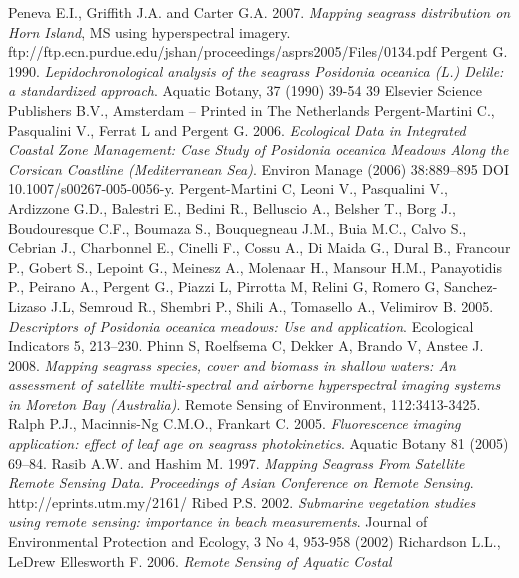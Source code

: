 \documentclass[10pt, a4paper]{article}
\begin{document}
\begin{thebibliography}{999}
Peneva E.I., Griffith J.A. and Carter G.A. 2007. \emph{Mapping seagrass distribution on Horn
Island}, MS using hyperspectral imagery.
ftp://ftp.ecn.purdue.edu/jshan/proceedings/asprs2005/Files/0134.pdf \pageref{Peneva07}
Pergent G. 1990. \emph{Lepidochronological analysis of the seagrass \textit{{Posidonia oceanica}} (L.)
Delile: a standardized approach}. Aquatic Botany, 37 (1990) 39-54 39 Elsevier Science
Publishers B.V., Amsterdam -- Printed in The Netherlands \pageref{Pergent90}
Pergent-Martini C., Pasqualini V., Ferrat L and Pergent G. 2006. \emph{Ecological Data in
Integrated Coastal Zone Management: Case Study of \textit{{Posidonia oceanica}} Meadows Along
the Corsican Coastline (Mediterranean Sea)}. Environ Manage (2006) 38:889–895 DOI
10.1007/s00267-005-0056-y. \pageref{Pergent-Martini06}
Pergent-Martini C, Leoni V., Pasqualini V., Ardizzone G.D., Balestri E., Bedini R.,
Belluscio A., Belsher T., Borg J., Boudouresque C.F., Boumaza S., Bouquegneau J.M., Buia
M.C., Calvo S., Cebrian J., Charbonnel E., Cinelli F., Cossu A., Di Maida G., Dural B.,
Francour P., Gobert S., Lepoint G., Meinesz A., Molenaar H., Mansour H.M., Panayotidis
P., Peirano A., Pergent G., Piazzi L, Pirrotta M, Relini G, Romero G, Sanchez-Lizaso J.L,
Semroud R., Shembri P., Shili A., Tomasello A., Velimirov B. 2005. \emph{Descriptors of
\textit{{Posidonia oceanica}} meadows: Use and application}. Ecological Indicators 5, 213–230. \pageref{Pergent-Martini05}
Phinn S, Roelfsema C, Dekker A, Brando V, Anstee J. 2008. \emph{Mapping seagrass species,
cover and biomass in shallow waters: An assessment of satellite multi-spectral and airborne
hyperspectral imaging systems in Moreton Bay (Australia)}. Remote Sensing of
Environment, 112:3413-3425. \pageref{Phinn08}
Ralph P.J., Macinnis-Ng C.M.O., Frankart C. 2005. \emph{Fluorescence imaging application:
effect of leaf age on seagrass photokinetics}. Aquatic Botany 81 (2005) 69–84. \pageref{Ralph05}
Rasib A.W. and Hashim M. 1997. \emph{Mapping Seagrass From Satellite Remote Sensing
Data. Proceedings of Asian Conference on Remote Sensing}. http://eprints.utm.my/2161/ \pageref{Rasib97}
Ribed P.S. 2002. \emph{Submarine vegetation studies using remote sensing: importance in
beach measurements}. Journal of Environmental Protection and Ecology, 3 No 4, 953-958
(2002) \pageref{Ribed02}
Richardson L.L., LeDrew Ellesworth F. 2006. \emph{Remote Sensing of Aquatic Costal
}
\end{thebibliography}
\end{document}
